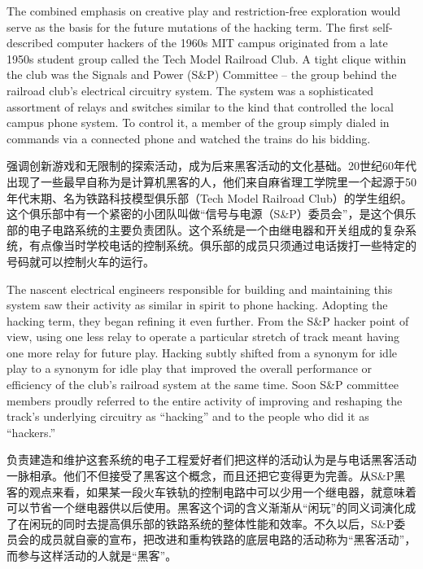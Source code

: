 \ifdefined\eng
The combined emphasis on creative play and restriction-free exploration would serve as the basis for the future mutations of the hacking term. The first self-described computer hackers of the 1960s MIT campus originated from a late 1950s student group called the Tech Model Railroad Club. A tight clique within the club was the Signals and Power (S\&P) Committee -- the group behind the railroad club's electrical circuitry system. The system was a sophisticated assortment of relays and switches similar to the kind that controlled the local campus phone system. To control it, a member of the group simply dialed in commands via a connected phone and watched the trains do his bidding.
\fi

\ifdefined\chs
强调创新游戏和无限制的探索活动，成为后来黑客活动的文化基础。20世纪60年代出现了一些最早自称为是计算机黑客的人，他们来自麻省理工学院里一个起源于50年代末期、名为铁路科技模型俱乐部（Tech Model Railroad Club）的学生组织。这个俱乐部中有一个紧密的小团队叫做``信号与电源（S\&P）委员会''，是这个俱乐部的电子电路系统的主要负责团队。这个系统是一个由继电器和开关组成的复杂系统，有点像当时学校电话的控制系统。俱乐部的成员只须通过电话拨打一些特定的号码就可以控制火车的运行。
\fi

\ifdefined\eng
The nascent electrical engineers responsible for building and maintaining this system saw their activity as similar in spirit to phone hacking. Adopting the hacking term, they began refining it even further. From the S\&P hacker point of view, using one less relay to operate a particular stretch of track meant having one more relay for future play. Hacking subtly shifted from a synonym for idle play to a synonym for idle play that improved the overall performance or efficiency of the club's railroad system at the same time. Soon S\&P committee members proudly referred to the entire activity of improving and reshaping the track's underlying circuitry as ``hacking'' and to the people who did it as ``hackers.''
\fi

\ifdefined\chs
负责建造和维护这套系统的电子工程爱好者们把这样的活动认为是与电话黑客活动一脉相承。他们不但接受了黑客这个概念，而且还把它变得更为完善。从S\&P黑客的观点来看，如果某一段火车铁轨的控制电路中可以少用一个继电器，就意味着可以节省一个继电器供以后使用。黑客这个词的含义渐渐从``闲玩''的同义词演化成了在闲玩的同时去提高俱乐部的铁路系统的整体性能和效率。不久以后，S\&P委员会的成员就自豪的宣布，把改进和重构铁路的底层电路的活动称为``黑客活动''，而参与这样活动的人就是``黑客''。
\fi

